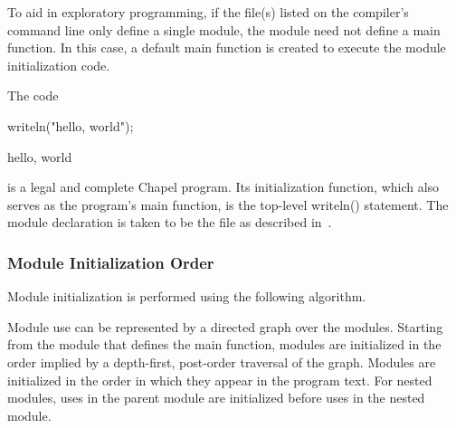 

To aid in exploratory programming, if the file(s) listed on the
compiler's command line only define a single module, the module need
not define a main function.  In this case, a default main function is
created to execute the module initialization code.
\begin{example}
The code
\begin{chapelpre}
\end{chapelpre}
\begin{chapel}
writeln("hello, world");
\end{chapel}
\begin{chapeloutput}
hello, world
\end{chapeloutput}
is a legal and complete Chapel program.  Its initialization function,
which also serves as the program's main function, is the top-level
writeln() statement.  The module declaration is taken to be the file
as described in~.
\end{example}


\subsubsection{Module Initialization Order}
\label{Module_Initialization_Order}

Module initialization is performed using the following algorithm.

Module use can be represented by a directed graph over the modules.
Starting from the module that defines the main function, modules are
initialized in the order implied by a depth-first, post-order
traversal of the graph.  Modules are initialized in the order in which
they appear in the program text.  For nested modules, uses in the
parent module are initialized before uses in the nested module.

